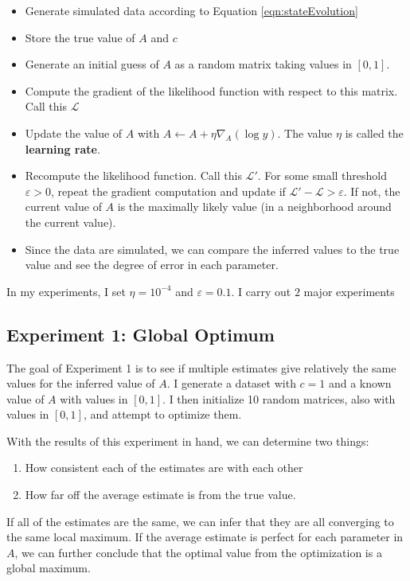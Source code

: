 \documentclass[12pt]{article}
\theoremstyle{definition}
\begin{document}
\begin{itemize}
    \item Generate simulated data according to Equation \ref{eqn:stateEvolution}
    \item Store the true value of $A$ and $c$
    \item Generate an initial guess of $A$ as a random matrix taking values in $[0, 1]$.
    \item Compute the gradient of the likelihood function with respect to this matrix. Call this $\mathcal{L}$
    \item Update the value of $A$ with $A \leftarrow A + \eta \nabla_A (\log y)$. The value $\eta$ is called the \textbf{learning rate}.
    \item Recompute the likelihood function. Call this $\mathcal{L}'$. For some small threshold $\varepsilon > 0$, repeat the gradient computation and update if $\mathcal{L}' - \mathcal{L} > \varepsilon$. If not, the current value of $A$ is the maximally likely value (in a neighborhood around the current value). 
    \item Since the data are simulated, we can compare the inferred values to the true value and see the degree of error in each parameter. 
\end{itemize}

In my experiments, I set $\eta = 10^{-4}$ and $\varepsilon = 0.1$. I carry out $2$ major experiments

\subsection{Experiment 1: Global Optimum}

The goal of Experiment 1 is to see if multiple estimates give relatively the same values for the inferred value of $A$. I generate a dataset with $c=1$ and a known value of $A$ with values in $[0, 1]$. I then initialize 10 random matrices, also with values in $[0, 1]$, and attempt to optimize them.

With the results of this experiment in hand, we can determine two things:

\begin{enumerate}
    \item How consistent each of the estimates are with each other
    \item How far off the average estimate is from the true value.
\end{enumerate}

If all of the estimates are the same, we can infer that they are all converging to the same local maximum. If the average estimate is perfect for each parameter in $A$, we can further conclude that the optimal value from the optimization is a global maximum.
\end{document}
